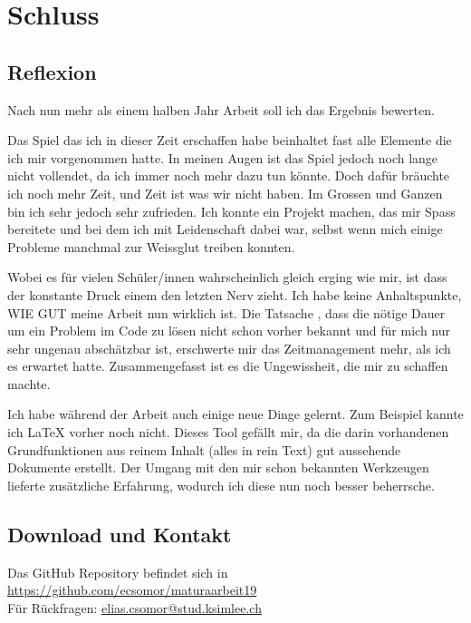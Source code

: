 \chapter{Schluss}

\section{Reflexion }

Nach nun mehr als einem halben Jahr Arbeit soll ich das Ergebnis bewerten.

\smallskip
Das Spiel das ich in dieser Zeit erschaffen habe beinhaltet fast alle Elemente die ich mir vorgenommen hatte.
In meinen Augen ist das Spiel jedoch noch lange nicht \glqq vollendet\grqq, da ich immer noch mehr dazu tun könnte.
Doch dafür bräuchte ich noch mehr Zeit, und Zeit ist was wir nicht haben.
Im Grossen und Ganzen bin ich sehr jedoch sehr zufrieden. Ich konnte ein Projekt machen, das mir Spass bereitete und bei dem ich mit Leidenschaft dabei war, selbst wenn mich einige Probleme manchmal zur Weissglut treiben konnten. 

\smallskip
Wobei es für vielen Schüler/innen wahrscheinlich gleich erging wie mir, ist dass der konstante Druck einem den letzten Nerv zieht. Ich habe keine Anhaltspunkte, WIE GUT meine Arbeit nun wirklich ist.
Die Tatsache , dass die nötige Dauer um ein Problem im Code zu lösen nicht schon vorher bekannt  und für mich nur sehr ungenau abschätzbar ist, erschwerte mir das Zeitmanagement mehr, als ich es erwartet hatte.
Zusammengefasst ist es die Ungewissheit, die mir zu schaffen machte.

\smallskip
Ich habe während der Arbeit auch einige neue Dinge gelernt.
Zum Beispiel kannte ich LaTeX vorher noch nicht.
Dieses Tool gefällt mir, da die darin vorhandenen Grundfunktionen aus reinem Inhalt (alles in rein Text) gut aussehende Dokumente erstellt.
Der Umgang mit den mir schon bekannten Werkzeugen lieferte zusätzliche Erfahrung, wodurch ich diese nun noch besser beherrsche.

\section{Download und Kontakt}

Das GitHub Repository befindet sich in\\
\url{https://github.com/ecsomor/maturaarbeit19}\\
Für Rückfragen: \href{mailto:elias.csomor@stud.ksimlee.ch}{elias.csomor@stud.ksimlee.ch}

